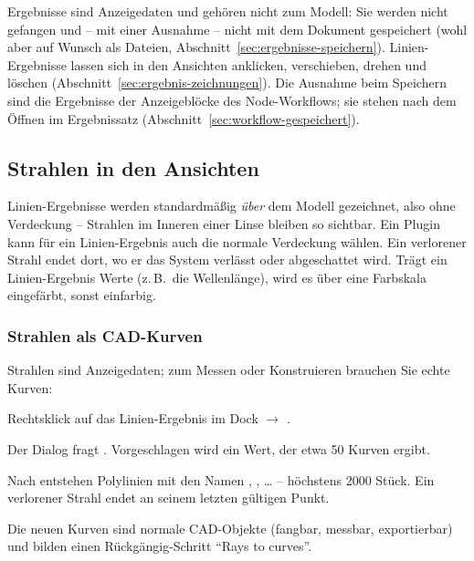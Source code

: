 \begin{hinweis}
Ergebnisse sind Anzeigedaten und gehören nicht zum Modell: Sie werden nicht gefangen und
– mit einer Ausnahme – nicht mit dem Dokument gespeichert (wohl aber auf Wunsch als Dateien,
Abschnitt~\ref{sec:ergebnisse-speichern}). Linien-Ergebnisse lassen sich in den Ansichten
anklicken, verschieben, drehen und löschen (Abschnitt~\ref{sec:ergebnis-zeichnungen}). Die
Ausnahme beim Speichern sind die
Ergebnisse der Anzeigeblöcke des Node-Workflows; sie stehen nach dem Öffnen im Ergebnissatz
 (Abschnitt~\ref{sec:workflow-gespeichert}).
\end{hinweis}

\subsection{Strahlen in den Ansichten}

Linien-Ergebnisse werden standardmäßig \emph{über} dem Modell gezeichnet, also ohne
Verdeckung – Strahlen im Inneren einer Linse bleiben so sichtbar. Ein Plugin kann für ein
Linien-Ergebnis auch die normale Verdeckung wählen. Ein verlorener Strahl endet dort, wo er das
System verlässt oder abgeschattet wird. Trägt ein Linien-Ergebnis Werte (z.\,B.\ die
Wellenlänge), wird es über eine Farbskala eingefärbt, sonst einfarbig.

\subsubsection{Strahlen als CAD-Kurven}\label{sec:strahlen-kurven}

Strahlen sind Anzeigedaten; zum Messen oder Konstruieren brauchen Sie echte Kurven:

\begin{schritte}
  \item Rechtsklick auf das Linien-Ergebnis im Dock  $\to$
        .
  \item Der Dialog  fragt . Vorgeschlagen
        wird ein Wert, der etwa 50 Kurven ergibt.
  \item Nach  entstehen Polylinien mit den Namen , , … –
        höchstens 2000 Stück. Ein verlorener Strahl endet an seinem letzten gültigen Punkt.
\end{schritte}

Die neuen Kurven sind normale CAD-Objekte (fangbar, messbar, exportierbar) und bilden einen
Rückgängig-Schritt \enquote{Rays to curves}.

